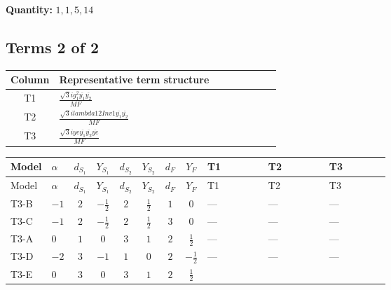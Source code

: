 \documentclass[8pt]{article}
\begin{document}
\begin{landscape}
\begin{longtable}{@{}llcccccc >{\raggedright\arraybackslash}p{0.21\linewidth} >{\raggedright\arraybackslash}p{0.21\linewidth} >{\raggedright\arraybackslash}p{0.21\linewidth}@{}}
\midrule
\bottomrule
\end{longtable}
\clearpage
\noindent\textbf{Quantity: }$\mathrm{1,1,5,14}$\par\smallskip
\subsection*{Terms 2 of 2}
\begin{center}
\begin{tabular}{@{}c >{\raggedright\arraybackslash}p{0.82\linewidth}@{}}
\toprule
Column & Representative term structure \\
\midrule
T1 & \(\displaystyle \frac{\sqrt{3} i g_{1}^{2} \overline{y_{1}} \overline{y_{2}}}{MF}\) \\
\midrule
T2 & \(\displaystyle \frac{\sqrt{3} i lambda12Inv1 \overline{y_{1}} \overline{y_{2}}}{MF}\) \\
\midrule
T3 & \(\displaystyle \frac{\sqrt{3} i ye \overline{y_{1}} \overline{y_{2}} \overline{ye}}{MF}\) \\
\midrule
\bottomrule
\end{tabular}
\end{center}
\smallskip
\tiny
\begin{longtable}{@{}llcccccc >{\raggedright\arraybackslash}p{0.21\linewidth} >{\raggedright\arraybackslash}p{0.21\linewidth} >{\raggedright\arraybackslash}p{0.21\linewidth}@{}}
\toprule
Model & $\alpha$ & $d_{S_1}$ & $Y_{S_1}$ & $d_{S_2}$ & $Y_{S_2}$ & $d_F$ & $Y_F$ & T1 & T2 & T3 \\
\midrule
\endfirsthead
\toprule
Model & $\alpha$ & $d_{S_1}$ & $Y_{S_1}$ & $d_{S_2}$ & $Y_{S_2}$ & $d_F$ & $Y_F$ & T1 & T2 & T3 \\
\midrule
\endhead
T3-B & $-1$ & $2$ & $-\frac{1}{2}$ & $2$ & $\frac{1}{2}$ & $1$ & $0$ & --- & --- & --- \\
\midrule
T3-C & $-1$ & $2$ & $-\frac{1}{2}$ & $2$ & $\frac{1}{2}$ & $3$ & $0$ & --- & --- & --- \\
\midrule
T3-A & $0$ & $1$ & $0$ & $3$ & $1$ & $2$ & $\frac{1}{2}$ & --- & --- & --- \\
\midrule
T3-D & $-2$ & $3$ & $-1$ & $1$ & $0$ & $2$ & $-\frac{1}{2}$ & --- & --- & --- \\
\midrule
T3-E & $0$ & $3$ & $0$ & $3$ & $1$ & $2$ & $\frac{1}{2}$ & \scriptsize\adjustbox{max width=\linewidth}{$\begin{gathered} - \frac{\sqrt{3} i g_{1}^{2} \overline{y_{1}} \overline{y_{2}}}{8 MF}\end{gathered}$} & \scriptsize\adjustbox{max width=\linewidth}{$\begin{gathered} \frac{\sqrt{3} i lambda12Inv1 \overline{y_{1}} \overline{y_{2}}}{6 MF}\end{gathered}$} & \scriptsize\adjustbox{max width=\linewidth}{$\begin{gathered} \frac{\sqrt{3} i ye \overline{y_{1}} \overline{y_{2}} \overline{ye}}{12 MF}\end{gathered}$} \\

\end{longtable}
\end{landscape}
\end{document}
